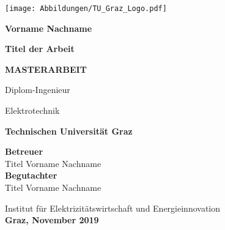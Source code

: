 %
%
%
%

\pagestyle{empty} \enlargethispage*{23cm}
	
\vspace*{-1.5cm}
\begin{center}
	\hspace*{-1.1cm}
	\texttt{[image: Abbildungen/TU\_Graz\_Logo.pdf]}
			
	\vspace*{1.5cm}
	
	{\normalsize \textbf{Vorname Nachname\\}}
	

	\vspace*{1.5cm} \LARGE\textbf{Titel der Arbeit}\vspace*{1cm} \vfill
	
	
	\large{\textbf{MASTERARBEIT\\}}

	\vspace*{1cm}{\normalsize zur Erlangung des akademischen Grades\\}
	{\normalsize {}Diplom-Ingenieur\\}

	{\normalsize {}Elektrotechnik\\}

	\vspace*{1cm}{\normalsize eingereicht an der\\}
	\large{\textbf{Technischen Universität Graz\\}}
	
	\vspace*{1.5cm}\large{\textbf{Betreuer\\}}
	{\normalsize {}Titel Vorname Nachname\\}
	\large{\textbf{Begutachter\\}} %
	{\normalsize Titel Vorname Nachname\\} %
	
	\vspace*{0.7cm}
	\normalsize Institut für Elektrizitätswirtschaft und Energieinnovation\\
	
	\vspace*{1.5cm}\small{\textbf{Graz, November 2019\\}} \vspace*{.7cm}
	
\end{center}

\clearpage 